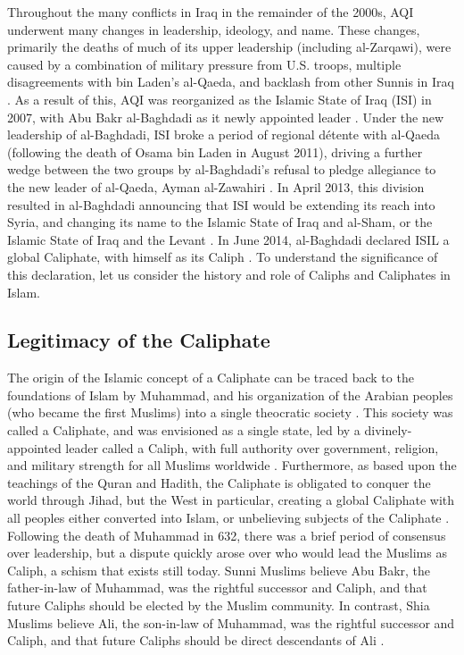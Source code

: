 \documentclass{report}
\begin{document}
    Throughout the many conflicts in Iraq in the remainder of the 2000s, AQI underwent many changes in leadership, ideology, and name. These changes, primarily the deaths of much of its upper leadership (including al-Zarqawi), were caused by a combination of military pressure from U.S. troops, multiple disagreements  with bin Laden's al-Qaeda, and backlash from other Sunnis in Iraq \cite{Zelin2014,Kahl2008}. As a result of this, AQI was reorganized as the Islamic State of Iraq (ISI) in 2007, with Abu Bakr al-Baghdadi as it newly appointed leader \cite{Zelin2014,Shadid2010}. Under the new leadership of al-Baghdadi, ISI broke a period of regional détente with al-Qaeda (following the death of Osama bin Laden in August 2011), driving a further wedge between the two groups by al-Baghdadi's refusal to pledge allegiance to the new leader of al-Qaeda, Ayman al-Zawahiri \cite{Al-Jawlani}. In April 2013, this division resulted in  al-Baghdadi announcing that ISI would be extending its reach into Syria, and changing its name to the Islamic State of Iraq and al-Sham, or the Islamic State of Iraq and the Levant \cite{Zelin2014,Al-Hussaini2013}. In June 2014, al-Baghdadi declared ISIL a global Caliphate, with himself as its Caliph \cite{Mortada2014,TheWeek2014}. To understand the significance of this declaration, let us consider the history and role of Caliphs and Caliphates in Islam.
    
    


\subsection{Legitimacy of the Caliphate}

The origin of the Islamic concept of a Caliphate can be traced back to the foundations of Islam by Muhammad, and his organization of the Arabian peoples (who became the first Muslims) into a single theocratic society  \cite{schmidt2004great,holt1977cambridge}. This society was called a Caliphate, and was envisioned as a single state, led by a divinely-appointed leader called a Caliph, with full authority over government, religion, and military strength for all Muslims worldwide \cite{lapidus2002history}. Furthermore, as based upon the teachings of the Quran and Hadith, the Caliphate is obligated to conquer the world through Jihad, but the West in particular, creating a global Caliphate with all peoples either converted into Islam, or unbelieving subjects of the Caliphate \cite{dawood2003koran,arabi2008divine,karsh2007islamic}. Following the death of Muhammad in 632, there was a brief period of consensus over leadership, but a dispute quickly arose over who would lead the Muslims as Caliph, a schism that exists still today. Sunni Muslims believe  Abu Bakr, the father-in-law of Muhammad, was the rightful successor and Caliph, and that future Caliphs should be elected by the Muslim community. In contrast, Shia Muslims believe  Ali, the son-in-law of Muhammad, was the rightful successor and Caliph, and that future Caliphs should be direct descendants of Ali \cite{karsh2007islamic,schmidt2004great}. 
\end{document}
